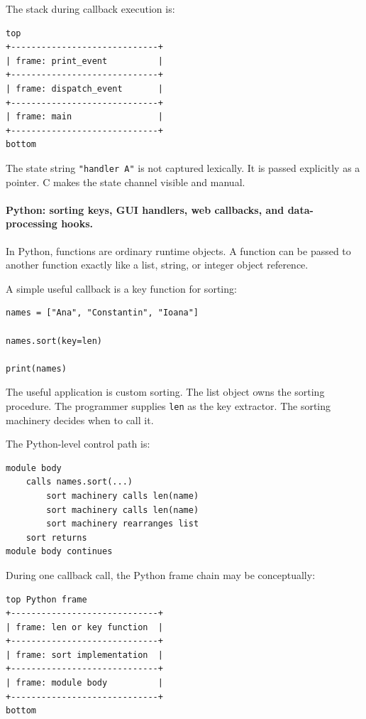 \documentclass[a4paper,twoside]{report}
\begin{document}
The stack during callback execution is:

\begin{verbatim}
top
+-----------------------------+
| frame: print_event          |
+-----------------------------+
| frame: dispatch_event       |
+-----------------------------+
| frame: main                 |
+-----------------------------+
bottom
\end{verbatim}

The state string \texttt{"handler A"} is not captured lexically. It is passed explicitly as a pointer. C makes the state channel visible and manual.

\paragraph{Python: sorting keys, GUI handlers, web callbacks, and data-processing hooks.}

In Python, functions are ordinary runtime objects. A function can be passed to another function exactly like a list, string, or integer object reference.

A simple useful callback is a key function for sorting:

\begin{verbatim}
names = ["Ana", "Constantin", "Ioana"]

names.sort(key=len)

print(names)
\end{verbatim}

The useful application is custom sorting. The list object owns the sorting procedure. The programmer supplies \texttt{len} as the key extractor. The sorting machinery decides when to call it.

The Python-level control path is:

\begin{verbatim}
module body
    calls names.sort(...)
        sort machinery calls len(name)
        sort machinery calls len(name)
        sort machinery rearranges list
    sort returns
module body continues
\end{verbatim}

During one callback call, the Python frame chain may be conceptually:

\begin{verbatim}
top Python frame
+-----------------------------+
| frame: len or key function  |
+-----------------------------+
| frame: sort implementation  |
+-----------------------------+
| frame: module body          |
+-----------------------------+
bottom
\end{verbatim}
\end{document}
